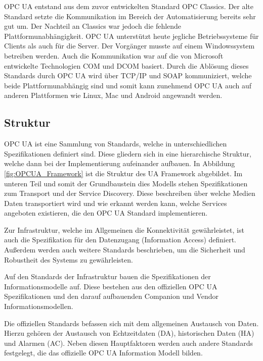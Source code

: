 \documentclass[a4paper, 12pt, oneside]{scrbook}
\begin{document}
	 OPC UA entstand aus dem zuvor entwickelten Standard OPC Classics. Der alte Standard setzte die Kommunikation im Bereich der Automatisierung bereits sehr gut um. Der Nachteil an Classics war jedoch die fehlende Plattformunabhängigkeit. OPC UA unterstützt heute jegliche Betriebssysteme für Clients als auch für die Server. Der Vorgänger musste auf einem Windowssystem betreiben werden. Auch die Kommunikation war auf die von Microsoft entwickelte Technologien \ac{COM} und \ac{DCOM} basiert. Durch die Ablösung dieses Standards durch OPC UA wird über TCP/IP und SOAP kommuniziert, welche beide Plattformunabhängig sind und somit kann zunehmend OPC UA auch auf anderen Plattformen wie Linux, Mac und Android angewandt werden. \cite{mielebacher_verteilte_2021-1}
	
		\subsection{Struktur}
		
		OPC UA ist eine Sammlung von Standards, welche in unterschiedlichen Spezifikationen definiert sind. Diese gliedern sich in eine hierarchische Struktur, welche dann bei der Implementierung aufeinander aufbauen. In Abbildung \ref{fig:OPCUA_Framework} ist die Struktur des UA Framework abgebildet. Im unteren Teil und somit der Grundbaustein dies Modells stehen Spezifikationen zum Transport und der Service Discovery. Diese beschreiben über welche Medien Daten transportiert wird und wie erkannt werden kann, welche Services angeboten existieren, die den OPC UA Standard implementieren. \cite{mahnke_opc_2009, rinke_was_2022}
		
		Zur Infrastruktur, welche im Allgemeinen die Konnektivität gewährleistet, ist auch die Spezifikation für den Datenzugang (Information Access) definiert. Außerdem werden auch weitere Standards beschrieben, um die Sicherheit und Robustheit des Systems zu gewährleisten.
		
		Auf den Standards der Infrastruktur bauen die Spezifikationen der Informationsmodelle auf. Diese bestehen aus den offiziellen OPC UA Spezifikationen und den darauf aufbauenden Companion und Vendor Informationsmodellen. \cite{mahnke_opc_2009}
		
		Die offiziellen Standards befassen sich mit dem allgemeinen Austausch von Daten. Hierzu gehören der Austausch von Echtzeitdaten (DA), historischen Daten (HA) und Alarmen (AC). Neben diesen Hauptfaktoren werden auch andere Standards festgelegt, die das offizielle OPC UA Information Modell bilden. \cite{mahnke_opc_2009, rinke_was_2022}
		
\end{document}
